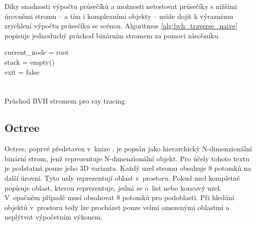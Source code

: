 Díky snadnosti výpočtu průsečíků a možnosti netestovat průsečíky s nižšími úrovněmi stromu -- a tím i komplexními objekty -- může dojít k výraznému zrychlení výpočtu průsečíku se scénou. Algoritmus \ref{alg:bvh_traverse_naive} popisuje jednoduchý průchod binárním stromem za pomoci zásobníku.

\begin{center}
	\begin{czechalgorithm}[H] \label{alg:bvh_traverse_naive}
		current\_node = root\\
		stack = empty()\\
		exit = false\\
		 {\\
		}\\
		\caption{Průchod BVH stromem pro ray tracing \cite{Vaidyanathan2019WideBT}}
	\end{czechalgorithm}
\end{center}



\subsection{Octree} \label{octree}
Octree, poprvé představen v~knize \cite{rensselaer1980octree}, je popsán jako hierarchický N-dimenzionální binární strom, jenž reprezentuje N-dimenzionální objekt. Pro účely tohoto textu je podstatná pouze jeho 3D varianta. Každý uzel stromu obsahuje 8 potomků na další úrovni. Tyto uzly reprezentují oblast v~prostoru. Pokud uzel kompletně popisuje oblast, kterou reprezentuje, jedná se o~list nebo koncový uzel. V~opačném případě musí obsahovat 8 potomků pro podoblasti. Při hledání objektů v~prostoru tedy lze procházet pouze velmi omezenými oblastmi a neplýtvat výpočetním výkonem.

